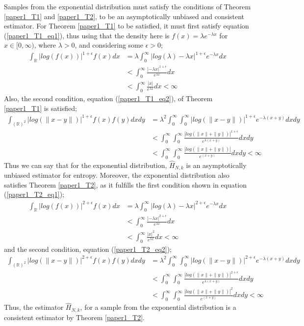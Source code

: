 \documentclass{report}
\begin{document}
Samples from the exponential distribution must satisfy the conditions of Theorem \ref{paper1_T1} and \ref{paper1_T2}, to  be an asymptotically unbiased and consistent estimator. For Theorem \ref{paper1_T1} to be satisfied, it must first satisfy equation (\ref{paper1_T1_eq1}), thus using that the density here is $f(x) = \lambda e^{-\lambda x}$ for $x \in [0, \infty)$, where $\lambda >0$, and considering some $\epsilon >0$;
\begin{align} \nonumber
\int_{\mathbb{R}} | log(f(x))|^{1 + \epsilon} f(x) dx  &= \lambda \int_{0}^{\infty} | log (\lambda) - \lambda x |^{1 + \epsilon} e^{- \lambda x} dx \\ \nonumber
&<  \int_{0}^{\infty} \frac{| - \lambda x |^{1 + \epsilon}}{ e^{\lambda x}} dx \\ \nonumber
&<  \int_{0}^{\infty} \frac{|x|}{ e^{\lambda x}} dx < \infty \nonumber
\end{align}
Also, the second condition, equation (\ref{paper1_T1_eq2}), of Theorem \ref{paper1_T1} is satisfied;
\begin{align} \nonumber
\int_{(\mathbb{R})^2} | log(\|x-y\|)|^{1+ \epsilon} f(x) f(y) dx dy  &= \lambda^2 \int_{0}^{\infty} \int_{0}^{\infty} | log(\|x-y\|)|^{1+ \epsilon} e^{- \lambda (x + y)} dx dy \\ \nonumber
&<  \int_{0}^{\infty} \int_{0}^{\infty}  \frac{| log(\|x\| + \|y\|)|^{1+ \epsilon}}{e^{\lambda (x + y)}} dx dy \\ \nonumber
&<  \int_{0}^{\infty} \int_{0}^{\infty}  \frac{| log(\|x\| + \|y\|)|}{e^{(x + y)}} dx dy < \infty  \nonumber
\end{align}
Thus we can say that for the exponential distribution, $\hat{H}_{N,k}$ is an asymptotically unbiased estimator for entropy. Moreover, the exponential distribution also satisfies Theorem \ref{paper1_T2}, as it fulfills the first condition shown in equation (\ref{paper1_T2_eq1});
\begin{align} \nonumber
\int_{\mathbb{R}} | log(f(x))|^{2 + \epsilon} f(x) dx  &= \lambda \int_{0}^{\infty} | log (\lambda) - \lambda x |^{2 + \epsilon} e^{- \lambda x} dx \\ \nonumber
&<  \int_{0}^{\infty} \frac{| - \lambda x |^{2 + \epsilon}}{ e^{\lambda x}} dx \\ \nonumber
&<  \int_{0}^{\infty} \frac{|x|^2}{ e^{\lambda x}} dx < \infty \nonumber
\end{align}
and the second condition, equation (\ref{paper1_T2_eq2});
\begin{align} \nonumber
\int_{(\mathbb{R})^2} | log(\|x-y\|)|^{2+ \epsilon} f(x) f(y) dx dy  &= \lambda^2 \int_{0}^{\infty} \int_{0}^{\infty} | log(\|x-y\|)|^{2+ \epsilon} e^{- \lambda (x + y)} dx dy \\ \nonumber
&<  \int_{0}^{\infty} \int_{0}^{\infty}  \frac{| log(\|x\| + \|y\|)|^{2+ \epsilon}}{e^{\lambda (x + y)}} dx dy \\ \nonumber
&<  \int_{0}^{\infty} \int_{0}^{\infty}  \frac{| log(\|x\| + \|y\|)|^2}{e^{(x + y)}} dx dy < \infty  \nonumber
\end{align}
Thus, the estimator $\hat{H}_{N,k}$, for a sample from the exponential distribution is a consistent estimator by Theorem \ref{paper1_T2}. 
\end{document}
